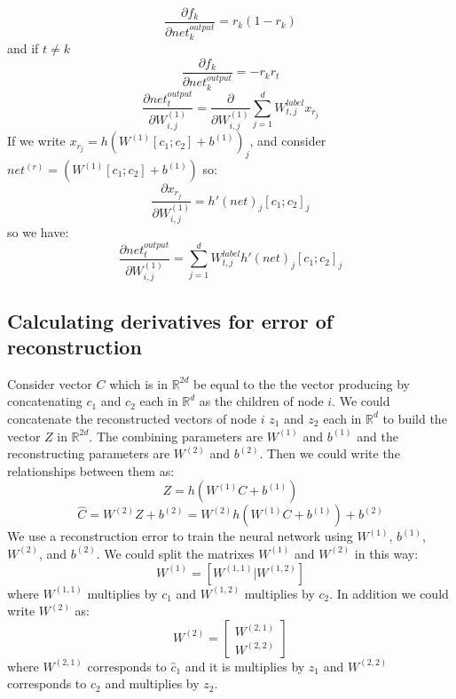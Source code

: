 \documentclass[twoside,12pt]{article}
\begin{document}
\begin{equation}
\frac{\partial f_k}{\partial net^{output}_{k}}=r_k(1-r_k)
\end{equation}
and if $t\neq k$
\begin{equation}
\frac{\partial f_k}{\partial net^{output}_{k}}=-r_kr_t
\end{equation}
\begin{equation}
\frac{\partial net^{output}_t}{\partial W^{(1)}_{i,j}}=\frac{\partial}{\partial W^{(1)}_{i,j}}\sum_{j=1}^{d}W^{label}_{t,j}x_{r_j}
\end{equation}
If we write $x_{r_j}=h(W^{(1)}[c_1;c_2]+b^{(1)})_j$, and consider $net^{(r)}=(W^{(1)}[c_1;c_2]+b^{(1)})$ so:
\begin{equation}
\frac{\partial x_{r_j}}{\partial W^{(1)}_{i,j}}= h'(net)_j[c_1;c_2]_j
\end{equation}
so we have:
\begin{equation}
 \frac{\partial net^{output}_t}{\partial W^{(1)}_{i,j}}=\sum_{j=1}^{d}W^{label}_{t,j}h'(net)_j[c_1;c_2]_j
\end{equation}

\subsection{Calculating derivatives for error of reconstruction}
Consider vector $C$ which is in $\mathbb{R}^{2d}$ be equal to the the vector producing by concatenating $c_1$ and $c_2$ each in $\mathbb{R}^d$ as the children of node $i$. We could concatenate the reconstructed vectors of node $i$ $z_1$ and $z_2$ each in $\mathbb{R}^d$ to build the vector $Z$ in $\mathbb{R}^{2d}$. The combining parameters are $W^{(1)}$ and $b^{(1)}$ and the reconstructing parameters are $W^{(2)}$ and $b^{(2)}$. Then we could write the relationships between them as:
\begin{equation}
Z = h(W^{(1)}C+b^{(1)})
\end{equation}
\begin{equation}
\hat{C}=W^{(2)}Z+b^{(2)}=W^{(2)}h(W^{(1)}C+b^{(1)})+b^{(2)}
\end{equation}
We use a reconstruction error to train the neural network using $W^{(1)}$, $b^{(1)}$, $W^{(2)}$, and $b^{(2)}$. We could split the matrixes $W^{(1)}$ and $W^{(2)}$ in this way:
\begin{equation}
W^{(1)}=[W^{(1,1)}|W^{(1,2)}]
\end{equation}
where $W^{(1,1)}$ multiplies by $c_1$ and $W^{(1,2)}$ multiplies by $c_2$. In addition we could write $W^{(2)}$ as:
\begin{equation}
W^{(2)}=\begin{bmatrix}
     W^{(2,1)} \\ \hline
     W^{(2,2)}
    \end{bmatrix}
\end{equation} 
where $W^{(2,1)}$ corresponds to $\hat{c}_1$ and it is multiplies by $z_1$ and $W^{(2,2)}$ corresponds to $\hat{c}_2$ and multiplies by $z_2$.
\end{document}
